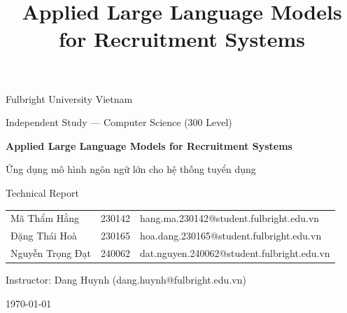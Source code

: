 \documentclass[11pt,a4paper]{article}
\title{Applied Large Language Models for Recruitment Systems}
\begin{document}
\begin{titlepage}
  \centering
  {\large Fulbright University Vietnam\par}
  \vspace{0.5cm}
  {\large Independent Study --- Computer Science (300 Level)\par}
  \vspace{3cm}
  {\LARGE\bfseries Applied Large Language Models for Recruitment Systems\par}
  \vspace{0.5cm}
  {\large Ứng dụng mô hình ngôn ngữ lớn cho hệ thống tuyển dụng\par}
  \vspace{0.5cm}
  {\large Technical Report\par}
  \vspace{3cm}
  \begin{tabular}{lll}
    Mã Thẩm Hằng   & 230142 & hang.ma.230142@student.fulbright.edu.vn \\
    Đặng Thái Hoà  & 230165 & hoa.dang.230165@student.fulbright.edu.vn \\
    Nguyễn Trọng Đạt & 240062 & dat.nguyen.240062@student.fulbright.edu.vn \\
  \end{tabular}
  \vspace{2cm}

  {\large Instructor: Dang Huynh (dang.huynh@fulbright.edu.vn)\par}
  \vfill
  {\large \today\par}
\end{titlepage}






\end{document}
